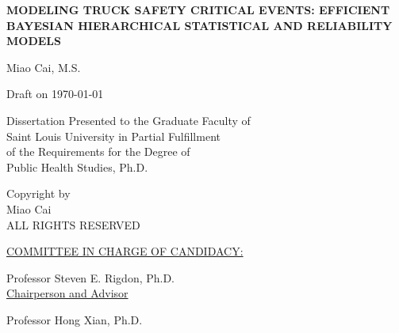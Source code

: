 \documentclass[12pt]{book}
\numberwithin{equation}{chapter}
\newenvironment{bottompar}{\par\vspace*{\fill}}{\clearpage}%
\begin{document}
\begin{titlepage}
\vspace{1cm}
\begin{center}
\linespread{2}\normalsize \bfseries \MakeUppercase{Modeling Truck Safety Critical Events: Efficient Bayesian Hierarchical Statistical and Reliability Models}
\end{center}

\vspace{7cm}

\begin{center}
{Miao Cai,  M.S.}
\vspace{0.3cm}

Draft on \today

\vspace{9cm}

Dissertation Presented to the Graduate Faculty of \\
Saint Louis University in Partial Fulfillment \\
of the Requirements for the Degree of\\
Public Health Studies, Ph.D.\\
\vspace{.5cm}
\the\year
\end{center}

\end{titlepage}
\clearpage


\begin{bottompar}
\begin{center}
\textcopyright \xspace Copyright by\\
Miao Cai \\
ALL RIGHTS RESERVED\\
\vspace{.5cm}
\the\year
\end{center}
\end{bottompar}

\vspace*{\fill}
\underline{COMMITTEE IN CHARGE OF CANDIDACY:}

\vspace{.3cm}
Professor Steven E. Rigdon, Ph.D.\\
{\setlength{\parindent}{20ex}  \indent \underline{Chairperson and Advisor}}

\vspace{.3cm}
Professor Hong Xian, Ph.D.
\end{document}
